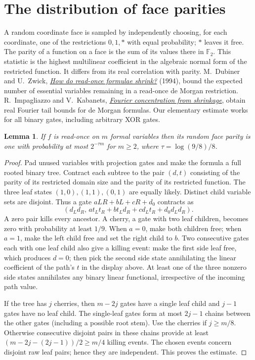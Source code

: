 \documentclass[11pt]{article}
\newtheorem{lemma}{Lemma}
\newcommand{\F}{\mathbb F_2}
\begin{document}
\section{The distribution of face parities}
A random coordinate face is sampled by independently choosing, for each coordinate, one of the restrictions $0,1,*$ with equal probability; $*$ leaves it free. The parity of a function on a face is the sum of its values there in $\F$. This statistic is the highest multilinear coefficient in the algebraic normal form of the restricted function. It differs from its real correlation with parity. M.~Dubiner and U.~Zwick, \href{https://doi.org/10.1017/S0963548300001358}{\emph{How do read-once formulae shrink?}} (1994), bound the expected number of essential variables remaining in a read-once de Morgan restriction. R.~Impagliazzo and V.~Kabanets, \href{https://eccc.weizmann.ac.il/report/2013/163/revision/2/download/}{\emph{Fourier concentration from shrinkage}}, obtain real Fourier tail bounds for de Morgan formulas. Our elementary estimate works for all binary gates, including arbitrary XOR gates.
\begin{lemma}\label{ro}
If $f$ is read-once on $m$ formal variables then its random face parity is one with probability at most $2^{-\tau m}$ for $m\ge2$, where $\tau=\log(9/8)/8$.
\end{lemma}
\begin{proof}
Pad unused variables with projection gates and make the formula a full rooted binary tree. Contract each subtree to the pair $(d,t)$ consisting of the parity of its restricted domain size and the parity of its restricted function. The three leaf states $(1,0),(1,1),(0,1)$ are equally likely. Distinct child variable sets are disjoint. Thus a gate $aLR+bL+cR+d_0$ contracts as
\[
 (d_Ld_R,\,a t_Lt_R+b t_Ld_R+c d_Lt_R+d_0d_Ld_R).
\]
A zero pair kills every ancestor. A cherry, a gate with two leaf children, becomes zero with probability at least $1/9$. When $a=0$, make both children free; when $a=1$, make the left child free and set the right child to $b$. Two consecutive gates each with one leaf child also give a killing event: make the first side leaf free, which produces $d=0$; then pick the second side state annihilating the linear coefficient of the path's $t$ in the display above. At least one of the three nonzero side states annihilates any binary linear functional, irrespective of the incoming path value.

If the tree has $j$ cherries, then $m-2j$ gates have a single leaf child and $j-1$ gates have no leaf child. The single-leaf gates form at most $2j-1$ chains between the other gates (including a possible root stem). Use the cherries if $j\ge m/8$. Otherwise consecutive disjoint pairs in these chains provide at least $(m-2j-(2j-1))/2\ge m/4$ killing events. The chosen events concern disjoint raw leaf pairs; hence they are independent. This proves the estimate.
\end{proof}
\end{document}
